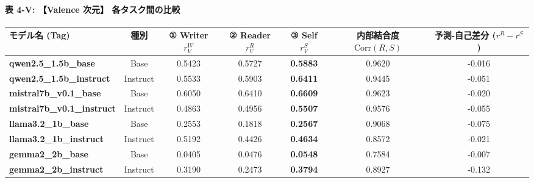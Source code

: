 \paragraph{表 4-V: 【Valence 次元】 各タスク間の比較}
\begin{center}
\small
\begin{tabular}{lcccccc}
\toprule
\textbf{モデル名 (Tag)} & \textbf{種別} & \textbf{① Writer $r_V^W$} & \textbf{② Reader $r_V^R$} & \textbf{③ Self $r_V^S$} & \textbf{内部結合度 $\text{Corr}(R, S)$} & \textbf{予測-自己差分 ($r^R - r^S$)} \\
\midrule
\textbf{qwen2.5\_1.5b\_base} & Base & 0.5423 & 0.5727 & \textbf{0.5883} & 0.9620 & -0.016 \\
\textbf{qwen2.5\_1.5b\_instruct} & Instruct & 0.5533 & 0.5903 & \textbf{0.6411} & 0.9445 & -0.051 \\
\textbf{mistral7b\_v0.1\_base} & Base & 0.6050 & 0.6410 & \textbf{0.6609} & 0.9623 & -0.020 \\
\textbf{mistral7b\_v0.1\_instruct} & Instruct & 0.4863 & 0.4956 & \textbf{0.5507} & 0.9576 & -0.055 \\
\textbf{llama3.2\_1b\_base} & Base & 0.2553 & 0.1818 & \textbf{0.2567} & 0.9068 & -0.075 \\
\textbf{llama3.2\_1b\_instruct} & Instruct & 0.5192 & 0.4426 & \textbf{0.4634} & 0.8572 & -0.021 \\
\textbf{gemma2\_2b\_base} & Base & 0.0405 & 0.0476 & \textbf{0.0548} & 0.7584 & -0.007 \\
\textbf{gemma2\_2b\_instruct} & Instruct & 0.3190 & 0.2473 & \textbf{0.3794} & 0.8927 & -0.132 \\
\bottomrule
\end{tabular}
\end{center}


